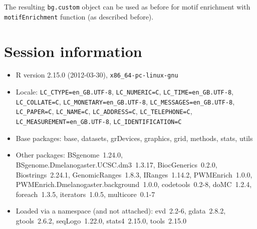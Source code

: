 \documentclass{article}
\newcommand{\Robj}[1]{{\texttt{#1}}}
\begin{document}
The resulting \Robj{bg.custom} object can be used as before for motif enrichment with \Robj{motifEnrichment} function (as described before).

\section{Session information}

\begin{itemize}\raggedright
  \item R version 2.15.0 (2012-03-30), \verb|x86_64-pc-linux-gnu|
  \item Locale: \verb|LC_CTYPE=en_GB.UTF-8|, \verb|LC_NUMERIC=C|, \verb|LC_TIME=en_GB.UTF-8|, \verb|LC_COLLATE=C|, \verb|LC_MONETARY=en_GB.UTF-8|, \verb|LC_MESSAGES=en_GB.UTF-8|, \verb|LC_PAPER=C|, \verb|LC_NAME=C|, \verb|LC_ADDRESS=C|, \verb|LC_TELEPHONE=C|, \verb|LC_MEASUREMENT=en_GB.UTF-8|, \verb|LC_IDENTIFICATION=C|
  \item Base packages: base, datasets, grDevices, graphics, grid,
    methods, stats, utils
  \item Other packages: BSgenome~1.24.0,
    BSgenome.Dmelanogaster.UCSC.dm3~1.3.17, BiocGenerics~0.2.0,
    Biostrings~2.24.1, GenomicRanges~1.8.3, IRanges~1.14.2,
    PWMEnrich~1.0.0, PWMEnrich.Dmelanogaster.background~1.0.0,
    codetools~0.2-8, doMC~1.2.4, foreach~1.3.5, iterators~1.0.5,
    multicore~0.1-7
  \item Loaded via a namespace (and not attached): evd~2.2-6,
    gdata~2.8.2, gtools~2.6.2, seqLogo~1.22.0, stats4~2.15.0,
    tools~2.15.0
\end{itemize}



\end{document}
